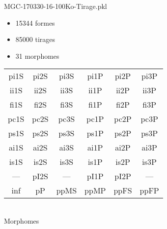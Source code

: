 MGC-170330-16-100Ko-Tirage.pkl
\begin{itemize}
\item 15344 formes
\item 85000 tirages
\item 31 morphomes
\end{itemize}
\begin{center}
\begin{tabular}{cccccc}
\hline
\cellcolor{white}pi1S & \cellcolor{orange}pi2S & \cellcolor{orange}pi3S & \cellcolor{white}pi1P & \cellcolor{white}pi2P & \cellcolor{white}pi3P\\
\cellcolor{brown}ii1S & \cellcolor{brown}ii2S & \cellcolor{brown}ii3S & \cellcolor{white}ii1P & \cellcolor{white}ii2P & \cellcolor{brown}ii3P\\
\cellcolor{yellow}fi1S & \cellcolor{lime}fi2S & \cellcolor{lime}fi3S & \cellcolor{green}fi1P & \cellcolor{white}fi2P & \cellcolor{green}fi3P\\
\cellcolor{yellow}pc1S & \cellcolor{yellow}pc2S & \cellcolor{yellow}pc3S & \cellcolor{white}pc1P & \cellcolor{white}pc2P & \cellcolor{yellow}pc3P\\
\cellcolor{teal}ps1S & \cellcolor{teal}ps2S & \cellcolor{teal}ps3S & \cellcolor{white}ps1P & \cellcolor{white}ps2P & \cellcolor{teal}ps3P\\
\cellcolor{white}ai1S & \cellcolor{lightgray}ai2S & \cellcolor{lightgray}ai3S & \cellcolor{white}ai1P & \cellcolor{pink}ai2P & \cellcolor{white}ai3P\\
\cellcolor{pink}is1S & \cellcolor{pink}is2S & \cellcolor{lightgray}is3S & \cellcolor{pink}is1P & \cellcolor{black}is2P & \cellcolor{pink}is3P\\
--- & \cellcolor{white}pI2S & --- & \cellcolor{white}pI1P & \cellcolor{white}pI2P & ---\\
\cellcolor{white}inf & \cellcolor{white}pP & \cellcolor{white}ppMS & \cellcolor{white}ppMP & \cellcolor{white}ppFS & \cellcolor{white}ppFP\\
\hline
\end{tabular}\\
Morphomes
\end{center}
\bigskip


